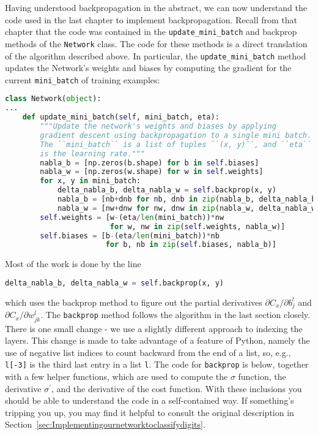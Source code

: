 Having understood backpropagation in the abstract, we can now understand the code used in the last chapter to implement backpropagation. Recall from that chapter that the code was contained in the \lstinline{update_mini_batch} and backprop methods of the \lstinline{Network} class. The code for these methods is a direct translation of the algorithm described above. In particular, the \lstinline{update_mini_batch} method updates the Network's weights and biases by computing the gradient for the current \lstinline{mini_batch} of training examples: 


\begin{fullwidth}
\begin{lstlisting}[language=Python]
class Network(object):
...
    def update_mini_batch(self, mini_batch, eta):
        """Update the network's weights and biases by applying
        gradient descent using backpropagation to a single mini batch.
        The ``mini_batch`` is a list of tuples ``(x, y)``, and ``eta``
        is the learning rate."""
        nabla_b = [np.zeros(b.shape) for b in self.biases]
        nabla_w = [np.zeros(w.shape) for w in self.weights]
        for x, y in mini_batch:
            delta_nabla_b, delta_nabla_w = self.backprop(x, y)
            nabla_b = [nb+dnb for nb, dnb in zip(nabla_b, delta_nabla_b)]
            nabla_w = [nw+dnw for nw, dnw in zip(nabla_w, delta_nabla_w)]
        self.weights = [w-(eta/len(mini_batch))*nw
                        for w, nw in zip(self.weights, nabla_w)]
        self.biases = [b-(eta/len(mini_batch))*nb
                       for b, nb in zip(self.biases, nabla_b)]
\end{lstlisting}
\end{fullwidth}


Most of the work is done by the line 
\begin{lstlisting}[language=Python]
delta_nabla_b, delta_nabla_w = self.backprop(x, y)
\end{lstlisting}
which uses the backprop method to figure out the partial derivatives $\partial C_{x} / \partial b_{j}^{l}$ and $\partial C_{x} / \partial w_{j k}^{l}$. The \lstinline{backprop} method follows the algorithm in the last section closely. There is one small change - we use a slightly different approach to indexing the layers. This change is made to take advantage of a feature of Python, namely the use of negative list indices to count backward from the end of a list, so, e.g., \lstinline{l[-3]} is the third last entry in a list \lstinline{l}. The code for \lstinline{backprop} is below, together with a few helper functions, which are used to compute the $\sigma$ function, the derivative $\sigma^\prime$, and the derivative of the cost function. With these inclusions you should be able to understand the code in a self-contained way. If something's tripping you up, you may find it helpful to consult the original description in Section~\ref{sec:Implementingournetworktoclassifydigits}.


